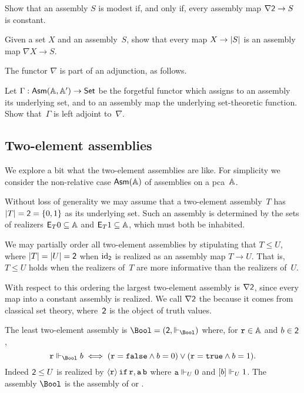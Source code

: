 \begin{exercise}
  Show that an assembly $S$ is modest if, and only if, every assembly map $\nabla \two \to S$ is constant.
\end{exercise}

\begin{exercise}
  Given a set $X$ and an assembly~$S$, show that every map $X \to \S{S}$ is an assembly map $\nabla X \to S$.
\end{exercise}

The functor $\nabla$ is part of an adjunction, as follows.

\begin{exercise}
  Let $\Gamma : \AsmA \to \Set$ be the forgetful functor which assigns to an assembly its underlying set, and to an
  assembly map the underlying set-theoretic function. Show that~$\Gamma$ is left adjoint to~$\nabla$.
\end{exercise}


\subsection{Two-element assemblies}
\label{sec:two-elem-asm}

We explore a bit what the two-element assemblies are like. For simplicity we consider the non-relative case $\Asm{\AA}$ of assemblies on a pca~$\AA$.

Without loss of generality we may assume that a two-element assembly~$T$ has $\S{T} = \two = \{0, 1\}$ as its underlying set. Such an assembly is determined by the sets of realizers $\Ex{T} 0 \subseteq \AA$ and $\Ex{T} 1 \subseteq \AA$, which must both be inhabited.

We may partially order all two-element assemblies by stipulating that $T \leq U$, where $\S{T} = \S{U} = \two$ when $\id[\two]$ is realized as an assembly map $T \to U$.
That is, $T \leq U$ holds when the realizers of~$T$ are more informative than the realizers of~$U$.

With respect to this ordering the largest two-element assembly is $\nabla \two$, since every map into a constant assembly is realized. We call $\nabla \two$ the  because it comes from classical set theory, where~$\two$ is the object of truth values.

The least two-element assembly is $\Bool = (\two, {\rz[\Bool]})$ where, for $\R{r} \in \AA$ and $b \in \two$,
%
\begin{equation*}
  \R{r} \rz[\Bool] b
  \iff
  (\R{r} = \combFalse \land b = 0) \lor
  (\R{r} = \combTrue \land b = 1).
\end{equation*}
%
Indeed $\two \leq U$ is realized by $\pcalam{\R{r}} \combIf\,\R{r},\R{a}\,\R{b}$ where $\R{a} \rz[U] 0$ and $\R[b] \rz[U] 1$.
%
The assembly $\Bool$ is the assembly of  or .

